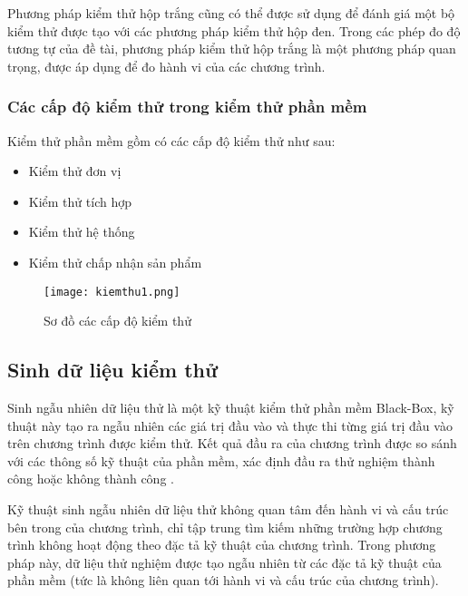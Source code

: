 Phương pháp kiểm thử hộp trắng cũng có thể được sử dụng để đánh giá một bộ kiểm thử được tạo với các phương pháp kiểm thử hộp đen. Trong các phép đo độ tương tự của đề tài, phương pháp kiểm thử hộp trắng là một phương pháp quan trọng, được áp dụng để đo hành vi của các chương trình.
	
\subsubsection{Các cấp độ kiểm thử trong kiểm thử phần mềm}
Kiểm thử phần mềm gồm có các cấp độ kiểm thử như sau:
\begin{itemize}
	\item Kiểm thử đơn vị
	\item Kiểm thử tích hợp
	\item Kiểm thử hệ thống
	\item Kiểm thử chấp nhận sản phẩm
\end{itemize}
	
\begin{center}
	\begin{figure}[h]
		\begin{center}
			\texttt{[image: kiemthu1.png]}
		\end{center}
		\caption{Sơ đồ các cấp độ kiểm thử}		
	\end{figure}
\end{center}

\subsection{Sinh dữ liệu kiểm thử}
Sinh ngẫu nhiên dữ liệu thử là một kỹ thuật kiểm thử phần mềm Black-Box, kỹ thuật này tạo ra ngẫu nhiên các giá trị đầu vào và thực thi từng giá trị đầu vào trên chương trình được kiểm thử. Kết quả đầu ra của chương trình được so sánh với các thông số kỹ thuật của phần mềm, xác định đầu ra thử nghiệm thành công hoặc không thành công \cite{myers2011art}.  

Kỹ thuật sinh ngẫu nhiên dữ liệu thử không quan tâm đến hành vi và cấu trúc bên trong của chương trình, chỉ tập trung tìm kiếm những trường hợp chương trình không hoạt động theo đặc tả kỹ thuật của chương trình. Trong phương pháp này, dữ liệu thử nghiệm được tạo ngẫu nhiên từ các đặc tả kỹ thuật của phần mềm (tức là không liên quan tới hành vi và cấu trúc của chương trình).

